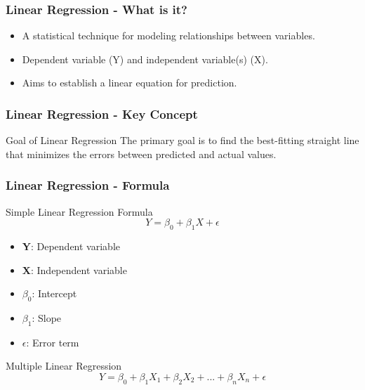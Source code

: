 \documentclass[aspectratio=169]{beamer}
\begin{document}
\begin{frame}[fragile]
    \frametitle{Linear Regression - What is it?}
    \begin{itemize}
        \item A statistical technique for modeling relationships between variables.
        \item Dependent variable (Y) and independent variable(s) (X).
        \item Aims to establish a linear equation for prediction.
    \end{itemize}
\end{frame}

\begin{frame}[fragile]
    \frametitle{Linear Regression - Key Concept}
    \begin{block}{Goal of Linear Regression}
        The primary goal is to find the best-fitting straight line that minimizes the errors between predicted and actual values.
    \end{block}
\end{frame}

\begin{frame}[fragile]
    \frametitle{Linear Regression - Formula}
    \begin{block}{Simple Linear Regression Formula}
        \begin{equation}
            Y = \beta_0 + \beta_1 X + \epsilon 
        \end{equation}
        \begin{itemize}
            \item \textbf{Y}: Dependent variable 
            \item \textbf{X}: Independent variable 
            \item \textbf{$\beta_0$}: Intercept 
            \item \textbf{$\beta_1$}: Slope 
            \item \textbf{$\epsilon$}: Error term 
        \end{itemize}
    \end{block}
    
    \begin{block}{Multiple Linear Regression}
        \begin{equation}
            Y = \beta_0 + \beta_1 X_1 + \beta_2 X_2 + ... + \beta_n X_n + \epsilon 
        \end{equation}
    \end{block}
\end{frame}
\end{document}
